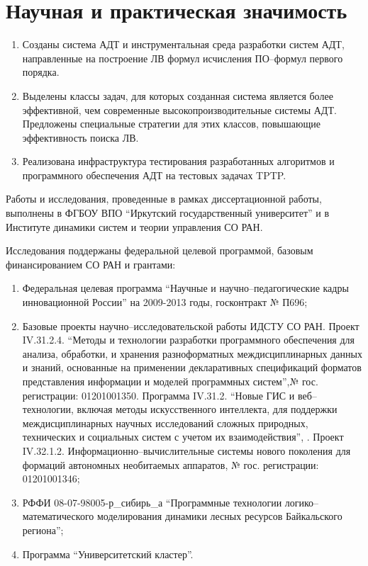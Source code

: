 \section*{Научная и практическая значимость}
\begin{enumerate}
\item Созданы система АДТ и инструментальная среда разработки систем АДТ, направленные на построение ЛВ формул исчисления ПО--формул первого порядка.
\item Выделены классы задач, для которых созданная система является более эффективной, чем современные высокопроизводительные системы АДТ. Предложены специальные стратегии для этих классов, повышающие эффективность поиска ЛВ.
\item Реализована инфраструктура тестирования разработанных алгоритмов и программного обеспечения АДТ на тестовых задачах TPTP. %
\end{enumerate}


Работы и исследования, проведенные в рамках  диссертационной работы, выполнены в ФГБОУ ВПО ``Иркутский государственный университет'' и в Институте динамики систем и теории управления СО РАН.

Исследования поддержаны федеральной целевой программой, базовым финансированием СО РАН и грантами:
\begin{enumerate}
\item Федеральная целевая программа ``Научные и научно--педагогические кадры инновационной России'' на 2009-2013 годы, госконтракт № П696;
\item Базовые проекты научно--исследовательской работы ИДСТУ СО РАН. Проект IV.31.2.4. ``Методы и технологии разработки программного обеспечения для анализа, обработки, и хранения разноформатных междисциплинарных данных и знаний, основанные на применении декларативных спецификаций форматов представления информации и моделей программных систем'',№ гос. регистрации: 01201001350. Программа IV.31.2. ``Новые ГИС и веб--технологии, включая методы искусственного интеллекта, для поддержки междисциплинарных научных исследований сложных природных, технических и социальных систем с учетом их взаимодействия'', . Проект IV.32.1.2. Информационно--вычислительные системы нового поколения для формаций автономных необитаемых аппаратов, № гос. регистрации: 01201001346;
\item РФФИ 08-07-98005-р\_сибирь\_а ``Программные технологии логико--математического моделирования динамики лесных ресурсов Байкальского региона'';
\item Программа ``Университетский кластер''.
\end{enumerate}

